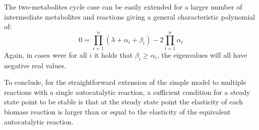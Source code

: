     The two-metabolites cycle case can be easily extended for a larger number of intermediate metabolites and reactions giving a general characteristic polynomial of:
    \begin{equation}
        \label{eq:complex}
        0=\prod_{i=1}^n(\lambda+\alpha_i+\beta_i)-2\prod_{i=1}^n\alpha_i
    \end{equation}
    Again, in cases were for all $i$ it holds that $\beta_i\geq\alpha_i$, the eigenvalues will all have negative real values.
    
    To conclude, for the straightforward extension of the simple model to multiple reactions with a single autocatalytic reaction, a sufficient condition for a steady state point to be stable is that at the steady state point the elasticity of each biomass reaction is larger than or equal to the elasticity of the equivalent autocatalytic reaction.
